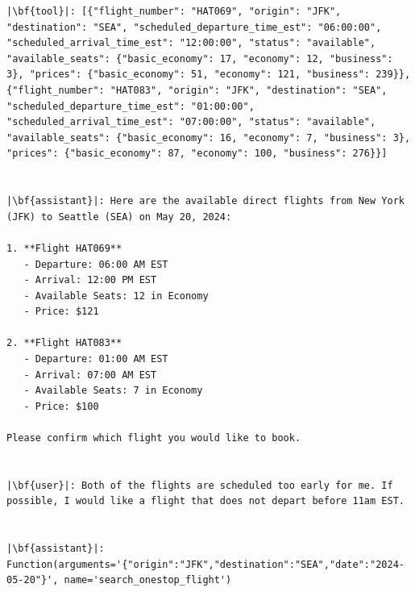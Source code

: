 \begin{verbatim}
|\bf{tool}|: [{"flight_number": "HAT069", "origin": "JFK", "destination": "SEA", "scheduled_departure_time_est": "06:00:00", "scheduled_arrival_time_est": "12:00:00", "status": "available", "available_seats": {"basic_economy": 17, "economy": 12, "business": 3}, "prices": {"basic_economy": 51, "economy": 121, "business": 239}}, {"flight_number": "HAT083", "origin": "JFK", "destination": "SEA", "scheduled_departure_time_est": "01:00:00", "scheduled_arrival_time_est": "07:00:00", "status": "available", "available_seats": {"basic_economy": 16, "economy": 7, "business": 3}, "prices": {"basic_economy": 87, "economy": 100, "business": 276}}]


|\bf{assistant}|: Here are the available direct flights from New York (JFK) to Seattle (SEA) on May 20, 2024:

1. **Flight HAT069**
   - Departure: 06:00 AM EST
   - Arrival: 12:00 PM EST
   - Available Seats: 12 in Economy
   - Price: $121

2. **Flight HAT083**
   - Departure: 01:00 AM EST
   - Arrival: 07:00 AM EST
   - Available Seats: 7 in Economy
   - Price: $100

Please confirm which flight you would like to book.


|\bf{user}|: Both of the flights are scheduled too early for me. If possible, I would like a flight that does not depart before 11am EST.


|\bf{assistant}|: Function(arguments='{"origin":"JFK","destination":"SEA","date":"2024-05-20"}', name='search_onestop_flight')



\end{verbatim}
